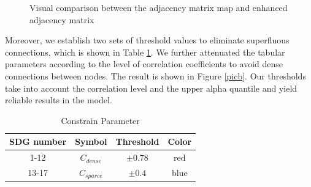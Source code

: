 \documentclass[10pt]{mcmthesis}
\begin{document}
 \begin{figure}[H]
    \centering
    
    \caption{ Visual comparison between the adjacency matrix map and enhanced adjacency matrix  }%
    \label{fig.compare}
\end{figure}

Moreover, we establish two sets of threshold values to eliminate superfluous connections, which is shown in  Table \ref{tab.cons}. 
We further attenuated the tabular parameters according to the level of correlation coefficients to avoid dense connections between nodes. The result is shown in Figure \ref{picb}. Our thresholds take into account the correlation level and the upper alpha quantile and yield reliable results in the model.

\begin{table}[h]\caption{Constrain Parameter}
\small
\centering
\label{tab.cons}
\begin{tabular}{cccc}
\hline
SDG number &    Symbol      & \multicolumn{1}{c}{Threshold}   & Color                                                   \\ \hline
1-12 &   $C_{dense}$           & $\pm 0.78$      & red                                             \\ 
13-17     &     $C_{sparce}$            &$\pm 0.4$ & blue   \\ \hline
\end{tabular}
\end{table}
\end{document}
